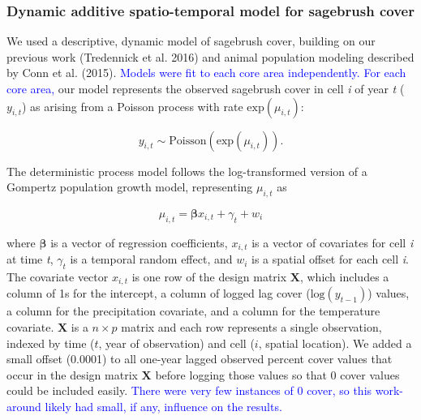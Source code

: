 \documentclass[
  12pt,
]{article}
\begin{document}
\hypertarget{dynamic-additive-spatio-temporal-model-for-sagebrush-cover}{%
\subsubsection{Dynamic additive spatio-temporal model for sagebrush cover}\label{dynamic-additive-spatio-temporal-model-for-sagebrush-cover}}

We used a descriptive, dynamic model of sagebrush cover, building on our previous work (Tredennick et al. 2016) and animal population modeling described by Conn et al. (2015).
\textcolor{blue}{Models were fit to each core area independently.}
\textcolor{blue}{For each core area,} our model represents the observed sagebrush cover in cell \emph{i} of year \emph{t} (\(y_{i,t}\)) as arising from a Poisson process with rate \(\text{exp}(\mu_{i,t})\):

\begin{equation}
y_{i,t} \sim \text{Poisson}(\text{exp}(\mu_{i,t})).
\end{equation}

\noindent{}The deterministic process model follows the log-transformed version of a Gompertz population growth model, representing \(\mu_{i,t}\) as

\begin{equation}
\label{eq:regression}
\mu_{i,t} = \bm{\beta} x_{i,t} + \gamma_{t} + w_{i}
\end{equation}

\noindent{}where \(\bm{\beta}\) is a vector of regression coefficients, \(x_{i,t}\) is a vector of covariates for cell \emph{i} at time \emph{t}, \(\gamma_{t}\) is a temporal random effect, and \(w_i\) is a spatial offset for each cell \emph{i}.
The covariate vector \(x_{i,t}\) is one row of the design matrix \(\textbf{X}\), which includes a column of 1s for the intercept, a column of logged lag cover (\(\text{log}(y_{t-1})\)) values, a column for the precipitation covariate, and a column for the temperature covariate.
\(\textbf{X}\) is a \(n \times p\) matrix and each row represents a single observation, indexed by time (\(t\), year of observation) and cell (\(i\), spatial location).
We added a small offset (0.0001) to all one-year lagged observed percent cover values that occur in the design matrix \(\textbf{X}\) before logging those values so that 0 cover values could be included easily.
\textcolor{blue}{There were very few instances of 0 cover, so this work-around likely had small, if any, influence on the results.}
\end{document}

